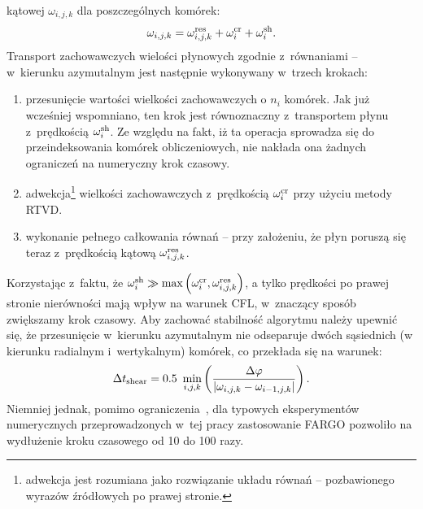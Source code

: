 kątowej $\omega_{i,j,k}$ dla poszczególnych komórek:
%
\begin{equation}
   \omega_{i,j,k} = \omega_{i,j,k}^{\rm res} + \omega_i^{\rm cr} + \omega_i^{\rm
sh}.
\end{equation}
%
Transport zachowawczych wielości płynowych zgodnie z~równaniami  --
 w~kierunku azymutalnym jest następnie wykonywany w~trzech krokach:
%
\begin{enumerate}
   \item przesunięcie wartości wielkości zachowawczych o $n_i$ komórek. Jak już
      wcześniej wspomniano, ten krok jest równoznaczny z~transportem płynu
      z~prędkością $\omega_i^{\rm sh}$. Ze względu na fakt, iż ta operacja
      sprowadza się do przeindeksowania komórek obliczeniowych, nie nakłada ona
      żadnych ograniczeń na numeryczny krok czasowy.
   \item adwekcja\footnote{adwekcja jest rozumiana jako rozwiązanie układu
      równań  --  pozbawionego wyrazów źródłowych po prawej
      stronie.} wielkości zachowawczych z~prędkością $\omega_i^{\rm cr}$ przy
      użyciu metody RTVD.
   \item wykonanie pełnego całkowania równań  --  przy
      założeniu, że płyn poruszą się teraz z~prędkością kątową
      $\omega_{i,j,k}^{\rm res}$.
\end{enumerate}
Korzystając z~faktu, że $\omega_i^{\rm sh} \gg \max\left(\omega_i^{\rm cr},
\omega_{i,j,k}^{\rm res}\right)$, a tylko prędkości po prawej stronie
nierówności mają wpływ na warunek CFL, w~znaczący sposób zwiększamy krok
czasowy. Aby zachować stabilność algorytmu należy upewnić się, że
przesunięcie w~kierunku azymutalnym nie odseparuje dwóch sąsiednich (w kierunku
radialnym i~wertykalnym) komórek, co przekłada się na warunek:
%
\begin{equation}\label{eq:tshear}
   \Delta t_{\rm shear} = 0.5 ~ \min_{i,j,k} \left( \frac{\Delta\varphi}
   {|\omega_{i,j,k} - \omega_{i-1,j,k}|} \right).
\end{equation}
%
Niemniej jednak, pomimo ograniczenia~, dla typowych eksperymentów
numerycznych przeprowadzonych w~tej pracy zastosowanie FARGO pozwoliło na
wydłużenie kroku czasowego od 10 do 100 razy.

